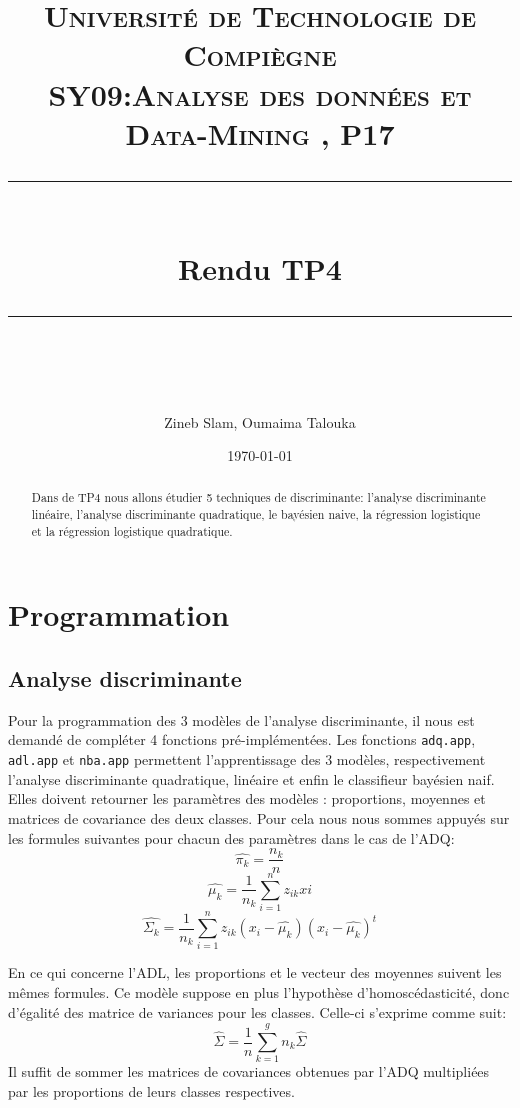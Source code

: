 \documentclass[10pt]{article}
\title{
	\normalfont \normalsize 
	\textsc{Université de Technologie de Compiègne\\ 
		SY09:Analyse des données et Data-Mining , P17} \\
	[10pt]
	\rule{\linewidth}{0.5pt} \\[6pt] 
	\huge Rendu TP4\\
	\rule{\linewidth}{2pt}  \\[10pt]
}
\author{Zineb Slam, Oumaima Talouka}
\date{\normalsize \today}
\begin{document}
	{\let\newpage\relax\maketitle}	
	
		\begin{abstract}
			Dans de TP4 nous allons étudier 5 techniques de discriminante: l'analyse discriminante linéaire, l'analyse discriminante quadratique, le bayésien naive, la régression logistique et la régression logistique quadratique. 
		\end{abstract}
	

\section{Programmation}
	\subsection{Analyse discriminante}
	Pour la programmation des 3 modèles de l'analyse discriminante, il nous est demandé de compléter 4 fonctions pré-implémentées.
	Les fonctions \texttt{adq.app}, \texttt{adl.app} et \texttt{nba.app} permettent l'apprentissage des 3 modèles, respectivement l'analyse discriminante quadratique, linéaire et enfin le classifieur bayésien naif. Elles doivent retourner les paramètres des modèles : proportions, moyennes et matrices de covariance des deux classes. Pour cela nous nous sommes appuyés sur les formules suivantes pour chacun des paramètres dans le cas de l'ADQ: 
	\begin{equation*}
	\widehat{\pi_{k}} = \dfrac{n_{k}}{n}
	\end{equation*}	
	\begin{equation*}
	\widehat{\mu_{k}} = \dfrac{1}{n_{k}}\sum_{i=1}^{n} z_{ik}x{i}
	\end{equation*}
	\begin{equation*}
	\widehat{\Sigma_{k}} = \dfrac{1}{n_{k}}\sum_{i=1}^{n} z_{ik} (x_{i}-\widehat{\mu_{k}})(x_{i}-\widehat{\mu_{k}})^{t}
	\end{equation*} 
	
	En ce qui concerne l'ADL, les proportions et le vecteur des moyennes suivent les mêmes formules. Ce modèle suppose en plus l'hypothèse d'homoscédasticité, donc d'égalité des matrice de variances pour les classes. Celle-ci s'exprime comme suit: 
	\begin{equation*}
	\widehat{\Sigma} = \dfrac{1}{n}\sum_{k=1}^{g} n_{k} \widehat{\Sigma}
	\end{equation*}	
	Il suffit de sommer les matrices de covariances obtenues par l'ADQ multipliées par les proportions de leurs classes respectives.
	
\end{document}
